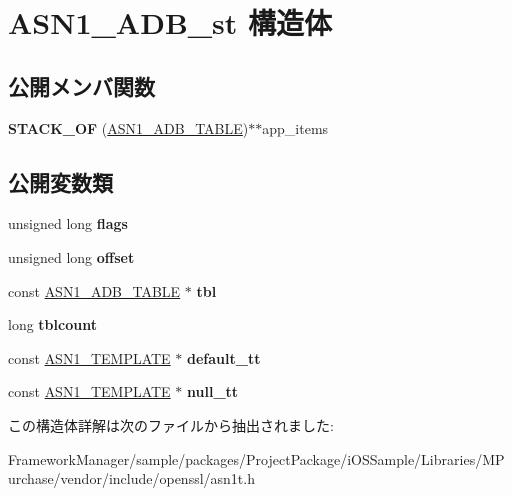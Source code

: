 \hypertarget{struct_a_s_n1___a_d_b__st}{}\section{A\+S\+N1\+\_\+\+A\+D\+B\+\_\+st 構造体}
\label{struct_a_s_n1___a_d_b__st}
\subsection*{公開メンバ関数}
\begin{DoxyCompactItemize}
\item 
\hypertarget{struct_a_s_n1___a_d_b__st_ac4ab6147f0b999107f8963dda8009ca7}{}{\bfseries S\+T\+A\+C\+K\+\_\+\+O\+F} (\hyperlink{struct_a_s_n1___a_d_b___t_a_b_l_e__st}{A\+S\+N1\+\_\+\+A\+D\+B\+\_\+\+T\+A\+B\+L\+E})$\ast$$\ast$app\+\_\+items\label{struct_a_s_n1___a_d_b__st_ac4ab6147f0b999107f8963dda8009ca7}

\end{DoxyCompactItemize}
\subsection*{公開変数類}
\begin{DoxyCompactItemize}
\item 
\hypertarget{struct_a_s_n1___a_d_b__st_a54eb419e2b98aef6bdb2eb51f6cc1e64}{}unsigned long {\bfseries flags}\label{struct_a_s_n1___a_d_b__st_a54eb419e2b98aef6bdb2eb51f6cc1e64}

\item 
\hypertarget{struct_a_s_n1___a_d_b__st_a62226ed62585729d4c60b6a238e4c10a}{}unsigned long {\bfseries offset}\label{struct_a_s_n1___a_d_b__st_a62226ed62585729d4c60b6a238e4c10a}

\item 
\hypertarget{struct_a_s_n1___a_d_b__st_a82869e99ac7536c3368719f3dc2be71c}{}const \hyperlink{struct_a_s_n1___a_d_b___t_a_b_l_e__st}{A\+S\+N1\+\_\+\+A\+D\+B\+\_\+\+T\+A\+B\+L\+E} $\ast$ {\bfseries tbl}\label{struct_a_s_n1___a_d_b__st_a82869e99ac7536c3368719f3dc2be71c}

\item 
\hypertarget{struct_a_s_n1___a_d_b__st_a329d8b9d61abbc5fed3507e68f21c656}{}long {\bfseries tblcount}\label{struct_a_s_n1___a_d_b__st_a329d8b9d61abbc5fed3507e68f21c656}

\item 
\hypertarget{struct_a_s_n1___a_d_b__st_a4d859d4ce5127475bdd551ea9cda1814}{}const \hyperlink{struct_a_s_n1___t_e_m_p_l_a_t_e__st}{A\+S\+N1\+\_\+\+T\+E\+M\+P\+L\+A\+T\+E} $\ast$ {\bfseries default\+\_\+tt}\label{struct_a_s_n1___a_d_b__st_a4d859d4ce5127475bdd551ea9cda1814}

\item 
\hypertarget{struct_a_s_n1___a_d_b__st_a1254bc85d4f82423f0c402af13a97045}{}const \hyperlink{struct_a_s_n1___t_e_m_p_l_a_t_e__st}{A\+S\+N1\+\_\+\+T\+E\+M\+P\+L\+A\+T\+E} $\ast$ {\bfseries null\+\_\+tt}\label{struct_a_s_n1___a_d_b__st_a1254bc85d4f82423f0c402af13a97045}

\end{DoxyCompactItemize}


この構造体詳解は次のファイルから抽出されました\+:\begin{DoxyCompactItemize}
\item 
Framework\+Manager/sample/packages/\+Project\+Package/i\+O\+S\+Sample/\+Libraries/\+M\+Purchase/vendor/include/openssl/asn1t.\+h\end{DoxyCompactItemize}
